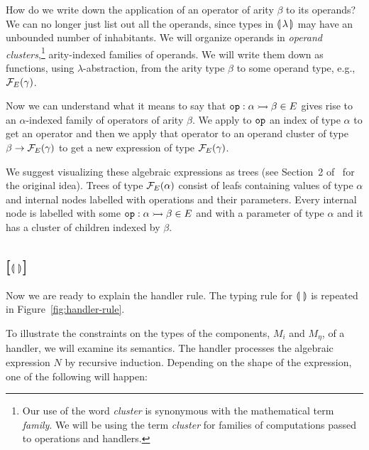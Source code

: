 \begin{itemize}
  How do we write down the application of an operator of arity $\beta$ to
  its operands? We can no longer just list out all the operands, since
  types in ${\llparenthesis \, \lambda \, \rrparenthesis}$ may have an unbounded number of inhabitants. We
  will organize operands in \emph{operand clusters},\footnote{Our use of
    the word \emph{cluster} is synonymous with the mathematical term
    \emph{family}. We will be using the term \emph{cluster} for families of
    computations passed to operations and handlers.} arity-indexed families
  of operands. We will write them down as functions, using
  $\lambda$-abstraction, from the arity type $\beta$ to some operand type,
  e.g., $\mathcal{F}_E(\gamma)$.
\end{itemize}

Now we can understand what it means to say that
$\mathtt{op} : \alpha \rightarrowtail \beta \in E$ gives rise to an $\alpha$-indexed
family of operators of arity $\beta$. We apply to $\mathtt{op}$ an index of
type $\alpha$ to get an operator and then we apply that operator to an
operand cluster of type $\beta \to \mathcal{F}_E(\gamma)$ to get a new expression
of type $\mathcal{F}_E(\gamma)$.

We suggest visualizing these algebraic expressions as trees (see Section~2
of~\cite{lindley2014algebraic} for the original idea). Trees of type
$\mathcal{F}_E(\alpha)$ consist of leafs containing values of type $\alpha$ and
internal nodes labelled with operations and their parameters. Every
internal node is labelled with some $\mathtt{op} : \alpha \rightarrowtail \beta \in E$ and
with a parameter of type $\alpha$ and it has a cluster of children indexed
by $\beta$.


\subsection*{[$\llparenthesis \,  \, \rrparenthesis$]}

Now we are ready to explain the handler rule. The typing rule for
$\llparenthesis \,  \, \rrparenthesis$ is repeated in Figure~\ref{fig:handler-rule}.

To illustrate the constraints on the types of the components, $M_i$ and
$M_\eta$, of a handler, we will examine its semantics. The handler
processes the algebraic expression $N$ by recursive induction. Depending on
the shape of the expression, one of the following will happen:

